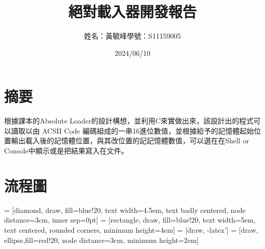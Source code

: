 \documentclass[UTF8,12pt]{article} %
\newcommand*{\kaiti}{\CJKfamily{zhkai}}   %
\begin{document}
\title{\bf{\kaiti 絕對載入器開發報告}}
\author{姓名：黃毓峰\hspace{1cm}學號：S11159005}
\date{2024/06/10}
\maketitle


\section{摘要}

  根據課本的Absolute Loader的設計構想，並利用C來實做出來，該設計出的程式可以讀取以由 ACSII Code 編碼組成的一串16進位數值，並根據給予的記憶體起始位置輸出載入後的記憶體位置，與其改位置的記記憶體數值，可以選在在Shell or Console中顯示或是把結果寫入在文件。



\section{流程圖}
  = [diamond, draw, fill=blue!20,
 text width=4.5em, text badly centered, node distance=3cm, inner sep=0pt]
  = [rectangle, draw, fill=blue!20,
 text width=5em, text centered, rounded corners, minimum height=4em]
  = [draw, -latex']
  = [draw, ellipse,fill=red!20, node distance=3cm,
 minimum height=2em]
\end{document}
